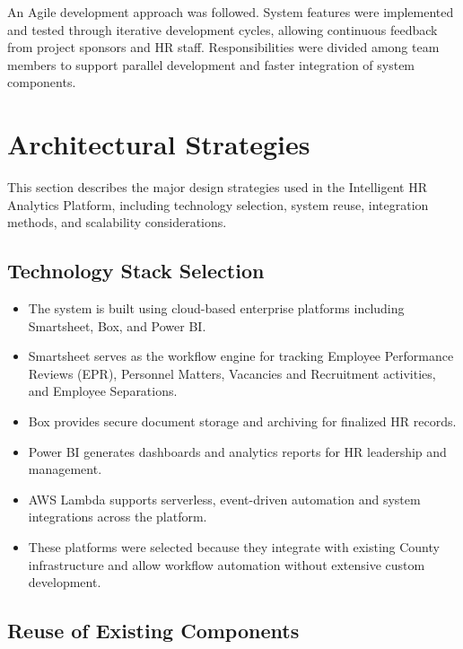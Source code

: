 \documentclass[12pt]{article}
\begin{document}
An Agile development approach was followed. System features were implemented and tested through iterative development cycles, allowing continuous feedback from project sponsors and HR staff. Responsibilities were divided among team members to support parallel development and faster integration of system components.


\section{Architectural Strategies}

This section describes the major design strategies used in the Intelligent HR Analytics Platform, including technology selection, system reuse, integration methods, and scalability considerations.

\subsection{Technology Stack Selection}

\begin{itemize}
    \item The system is built using cloud-based enterprise platforms including Smartsheet, Box, and Power BI.
    \item Smartsheet serves as the workflow engine for tracking Employee Performance Reviews (EPR), Personnel Matters, Vacancies and Recruitment activities, and Employee Separations.
    \item Box provides secure document storage and archiving for finalized HR records.
    \item Power BI generates dashboards and analytics reports for HR leadership and management.
    \item AWS Lambda supports serverless, event-driven automation and system integrations across the platform.
    \item These platforms were selected because they integrate with existing County infrastructure and allow workflow automation without extensive custom development.
\end{itemize}

\subsection{Reuse of Existing Components}
\end{document}
